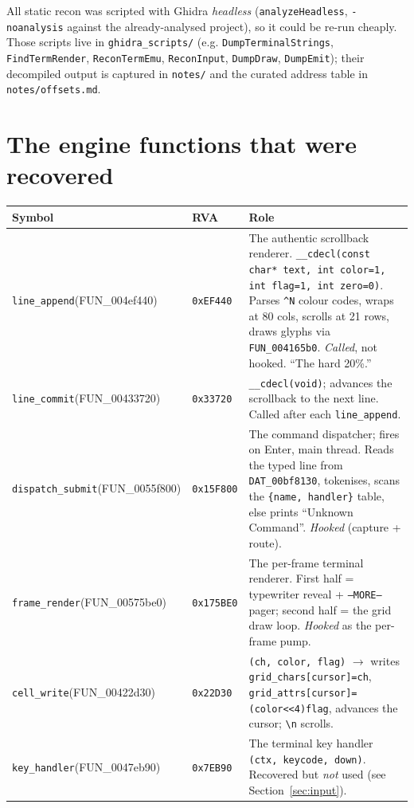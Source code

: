 \documentclass[11pt]{article}
\newcommand{\ic}[1]{\texttt{#1}}
\begin{document}
All static recon was scripted with Ghidra \emph{headless} (\texttt{analyzeHeadless},
\texttt{-noanalysis} against the already-analysed project), so it could be re-run
cheaply. Those scripts live in \texttt{ghidra_scripts/} (e.g.
\texttt{DumpTerminalStrings}, \texttt{FindTermRender}, \texttt{ReconTermEmu},
\texttt{ReconInput}, \texttt{DumpDraw}, \texttt{DumpEmit}); their decompiled output
is captured in \texttt{notes/} and the curated address table in
\texttt{notes/offsets.md}.

\section{The engine functions that were recovered}
\label{sec:functions}

\begin{longtable}{@{}p{3.1cm}p{1.7cm}p{8.3cm}@{}}
\toprule
\textbf{Symbol} & \textbf{RVA} & \textbf{Role} \\
\midrule
\endhead
\texttt{line_append}\newline(FUN_004ef440) & \texttt{0xEF440} &
The authentic scrollback renderer. \ic{__cdecl(const char* text, int color=1, int flag=1, int zero=0)}. Parses \ic{\textasciicircum N} colour codes, wraps at 80 cols, scrolls at 21 rows, draws glyphs via \texttt{FUN_004165b0}. \emph{Called}, not hooked. ``The hard 20\%.'' \\
\texttt{line_commit}\newline(FUN_00433720) & \texttt{0x33720} &
\ic{__cdecl(void)}; advances the scrollback to the next line. Called after each \texttt{line_append}. \\
\texttt{dispatch_submit}\newline(FUN_0055f800) & \texttt{0x15F800} &
The command dispatcher; fires on Enter, main thread. Reads the typed line from \texttt{DAT_00bf8130}, tokenises, scans the \ic{\{name, handler\}} table, else prints ``Unknown Command''. \emph{Hooked} (capture + route). \\
\texttt{frame_render}\newline(FUN_00575be0) & \texttt{0x175BE0} &
The per-frame terminal renderer. First half = typewriter reveal + \ic{--MORE--} pager; second half = the grid draw loop. \emph{Hooked} as the per-frame pump. \\
\texttt{cell_write}\newline(FUN_00422d30) & \texttt{0x22D30} &
\ic{(ch, color, flag)} $\rightarrow$ writes \ic{grid_chars[cursor]=ch}, \ic{grid_attrs[cursor]=(color<<4)\textbar flag}, advances the cursor; \texttt{\textbackslash n} scrolls. \\
\texttt{key_handler}\newline(FUN_0047eb90) & \texttt{0x7EB90} &
The terminal key handler \ic{(ctx, keycode, down)}. Recovered but \emph{not} used (see Section~\ref{sec:input}). \\
\bottomrule
\end{longtable}
\end{document}
